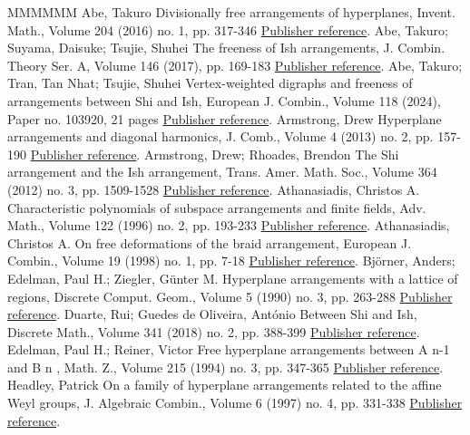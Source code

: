 \begin{thebibliography}{MMMMMM}
 Abe, Takuro Divisionally free arrangements of hyperplanes, Invent. Math., Volume 204 (2016) no. 1, pp. 317-346 \href{https://alco.centre-mersenne.org/articles/10.5802/alco.405/#Abe16}{Publisher reference}.
 Abe, Takuro; Suyama, Daisuke; Tsujie, Shuhei The freeness of Ish arrangements, J. Combin. Theory Ser. A, Volume 146 (2017), pp. 169-183 \href{https://alco.centre-mersenne.org/articles/10.5802/alco.405/#AST17}{Publisher reference}.
 Abe, Takuro; Tran, Tan Nhat; Tsujie, Shuhei Vertex-weighted digraphs and freeness of arrangements between Shi and Ish, European J. Combin., Volume 118 (2024), Paper no. 103920, 21 pages \href{https://alco.centre-mersenne.org/articles/10.5802/alco.405/#ATT24}{Publisher reference}.
 Armstrong, Drew Hyperplane arrangements and diagonal harmonics, J. Comb., Volume 4 (2013) no. 2, pp. 157-190 \href{https://alco.centre-mersenne.org/articles/10.5802/alco.405/#Arms13}{Publisher reference}.
 Armstrong, Drew; Rhoades, Brendon The Shi arrangement and the Ish arrangement, Trans. Amer. Math. Soc., Volume 364 (2012) no. 3, pp. 1509-1528 \href{https://alco.centre-mersenne.org/articles/10.5802/alco.405/#AR12}{Publisher reference}.
 Athanasiadis, Christos A. Characteristic polynomials of subspace arrangements and finite fields, Adv. Math., Volume 122 (1996) no. 2, pp. 193-233 \href{https://alco.centre-mersenne.org/articles/10.5802/alco.405/#A96}{Publisher reference}.
 Athanasiadis, Christos A. On free deformations of the braid arrangement, European J. Combin., Volume 19 (1998) no. 1, pp. 7-18 \href{https://alco.centre-mersenne.org/articles/10.5802/alco.405/#Atha98}{Publisher reference}.
 Björner, Anders; Edelman, Paul H.; Ziegler, Günter M. Hyperplane arrangements with a lattice of regions, Discrete Comput. Geom., Volume 5 (1990) no. 3, pp. 263-288 \href{https://alco.centre-mersenne.org/articles/10.5802/alco.405/#BEZ90}{Publisher reference}.
 Duarte, Rui; Guedes de Oliveira, António Between Shi and Ish, Discrete Math., Volume 341 (2018) no. 2, pp. 388-399 \href{https://alco.centre-mersenne.org/articles/10.5802/alco.405/#DG18}{Publisher reference}.
 Edelman, Paul H.; Reiner, Victor Free hyperplane arrangements between A n-1  and B n , Math. Z., Volume 215 (1994) no. 3, pp. 347-365 \href{https://alco.centre-mersenne.org/articles/10.5802/alco.405/#ER94}{Publisher reference}.
 Headley, Patrick On a family of hyperplane arrangements related to the affine Weyl groups, J. Algebraic Combin., Volume 6 (1997) no. 4, pp. 331-338 \href{https://alco.centre-mersenne.org/articles/10.5802/alco.405/#Headley97}{Publisher reference}.

\end{thebibliography}
